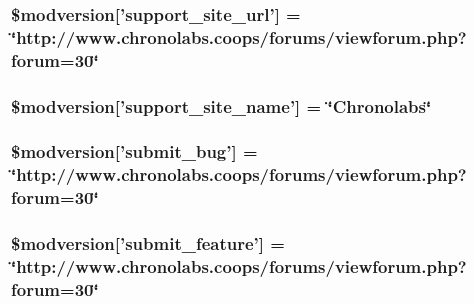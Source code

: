 \hypertarget{xoops__version_8php_a641a463ee220e6308d212336ac3fc5d3}{
\subsubsection[{\$modversion}]{\setlength{\rightskip}{0pt plus 5cm}\$modversion\mbox{[}'support\-\_\-site\-\_\-url'\mbox{]} = \char`\"{}http\-://www.\-chronolabs.\-coops/forums/viewforum.\-php?forum=30\char`\"{}}}\label{xoops__version_8php_a641a463ee220e6308d212336ac3fc5d3}
\hypertarget{xoops__version_8php_abf96815bce17f25c7e7536bc71495ae1}{
\subsubsection[{\$modversion}]{\setlength{\rightskip}{0pt plus 5cm}\$modversion\mbox{[}'support\-\_\-site\-\_\-name'\mbox{]} = \char`\"{}Chronolabs\char`\"{}}}\label{xoops__version_8php_abf96815bce17f25c7e7536bc71495ae1}
\hypertarget{xoops__version_8php_af3e5bbed6b430087f78267070c0ac644}{
\subsubsection[{\$modversion}]{\setlength{\rightskip}{0pt plus 5cm}\$modversion\mbox{[}'submit\-\_\-bug'\mbox{]} = \char`\"{}http\-://www.\-chronolabs.\-coops/forums/viewforum.\-php?forum=30\char`\"{}}}\label{xoops__version_8php_af3e5bbed6b430087f78267070c0ac644}
\hypertarget{xoops__version_8php_af10a40e06ffacd8c9887aa19248962ea}{
\subsubsection[{\$modversion}]{\setlength{\rightskip}{0pt plus 5cm}\$modversion\mbox{[}'submit\-\_\-feature'\mbox{]} = \char`\"{}http\-://www.\-chronolabs.\-coops/forums/viewforum.\-php?forum=30\char`\"{}}}\label{xoops__version_8php_af10a40e06ffacd8c9887aa19248962ea}
